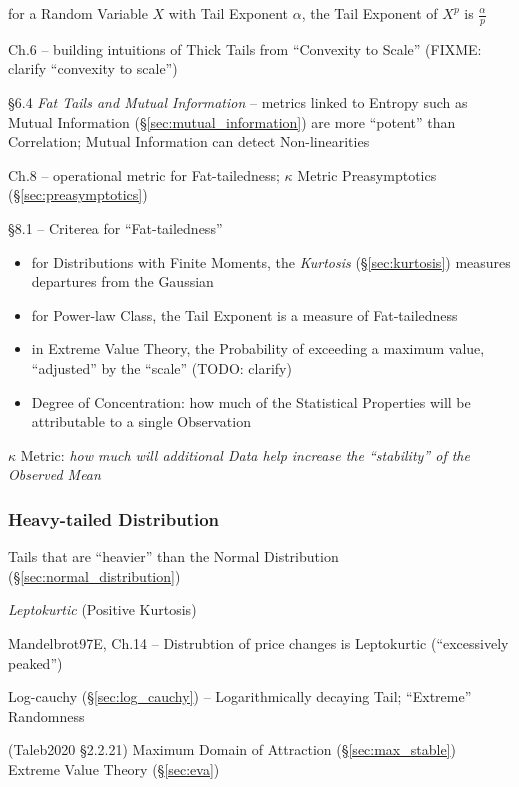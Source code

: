 for a Random Variable $X$ with Tail Exponent $\alpha$, the Tail Exponent of
$X^p$ is $\frac{\alpha}{p}$

Ch.6 -- building intuitions of Thick Tails from ``Convexity to Scale'' (FIXME:
clarify ``convexity to scale'')

\S 6.4 \emph{Fat Tails and Mutual Information}
-- metrics linked to Entropy such as Mutual Information
(\S\ref{sec:mutual_information}) are more ``potent'' than Correlation; Mutual
Information can detect Non-linearities

Ch.8 -- operational metric for Fat-tailedness; $\kappa$ Metric \fist
Preasymptotics (\S\ref{sec:preasymptotics})

\S 8.1 -- Criterea for ``Fat-tailedness''

\begin{itemize}
  \item for Distributions with Finite Moments, the \emph{Kurtosis}
    (\S\ref{sec:kurtosis}) measures departures from the Gaussian
  \item for Power-law Class, the Tail Exponent is a measure of Fat-tailedness
  \item in Extreme Value Theory, the Probability of exceeding a maximum value,
    ``adjusted'' by the ``scale'' (TODO: clarify)
  \item Degree of Concentration: how much of the Statistical Properties will
    be attributable to a single Observation
\end{itemize}

$\kappa$ Metric: \emph{how much will additional Data help increase the
``stability'' of the Observed Mean}



\subsubsection{Heavy-tailed Distribution}\label{sec:heavy_tailed}

Tails that are ``heavier'' than the Normal Distribution
(\S\ref{sec:normal_distribution})

\emph{Leptokurtic} (Positive Kurtosis)

Mandelbrot97E, Ch.14 -- Distrubtion of price changes is Leptokurtic
(``excessively peaked'')

Log-cauchy (\S\ref{sec:log_cauchy}) -- Logarithmically decaying Tail;
``Extreme'' Randomness

(Taleb2020 \S 2.2.21) Maximum Domain of Attraction (\S\ref{sec:max_stable})
\fist Extreme Value Theory (\S\ref{sec:eva})



